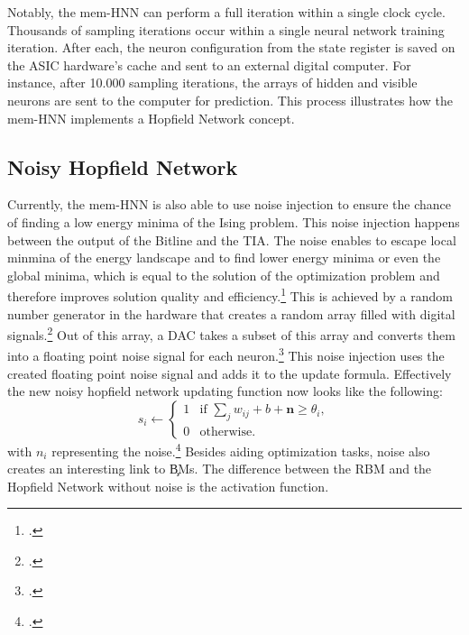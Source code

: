 Notably, the \ac{mem-HNN} can perform a full iteration within a single clock cycle.
Thousands of sampling iterations occur within a single neural network training iteration.
After each, the neuron configuration from the state register is saved on the \ac{ASIC} hardware's cache and sent to an external digital computer.
For instance, after 10.000 sampling iterations, the arrays of hidden and visible neurons are sent to the computer for prediction.
This process illustrates how the \ac{mem-HNN} implements a Hopfield Network concept.

\subsection{Noisy Hopfield Network}

Currently, the \ac{mem-HNN} is also able to use noise injection to ensure the chance of finding a low energy minima of the Ising problem.
This noise injection happens between the output of the Bitline and the \ac{TIA}. 
The noise enables to escape local minmina of the energy landscape and to find lower energy minima or even the global minima, which is equal to the solution of the optimization problem and therefore improves solution quality and efficiency.\footcite[cf.][410]{caiPowerefficientCombinatorialOptimization2020} 
This is achieved by a random number generator in the hardware that creates a random array filled with digital signals.\footcite[cf.][22]{caiHarnessingIntrinsicNoise2019}
Out of this array, a \ac{DAC} takes a subset of this array and converts them into a floating point noise signal for each neuron.\footcite[cf.][3]{hizzaniMemristorbasedHardwareAlgorithms2023}
This noise injection uses the created floating point noise signal and adds it to the update formula.
Effectively the new noisy hopfield network updating function now looks like the following: 
\begin{equation}
    s_i \leftarrow 
    \begin{cases} 
    1 & \text{if } \sum_j w_{ij}  + b + \mathbf{n} \geq \theta_i, \\
    0 & \text{otherwise}.
    \end{cases}
    \label{noisy_update_HNN_formula}
\end{equation}
with \(n_i\) representing the noise.\footcite[cf.][410]{caiPowerefficientCombinatorialOptimization2020} 
Besides aiding optimization tasks, noise also creates an interesting link to \c{BM}s.
The difference between the \ac{RBM} and the Hopfield Network without noise is the activation function.
